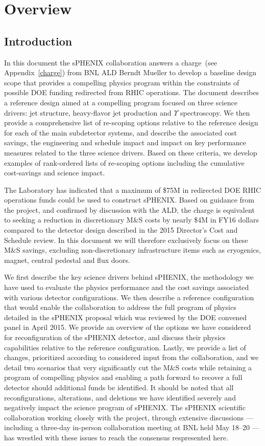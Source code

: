 \chapter{Overview}
\label{configurations}
\setcounter{page}{1}

\section{Introduction}
In this document the sPHENIX collaboration answers a charge~(see
Appendix~\ref{charge}) from BNL ALD Berndt Mueller to develop a
baseline design scope that provides a compelling physics program
within the constraints of possible DOE funding redirected from RHIC
operations. The document describes a reference design aimed at a
compelling program focused on three science drivers: jet structure,
heavy-flavor jet production and $\Upsilon$ spectroscopy. We then
provide a comprehensive list of re-scoping options relative to the
reference design for each of the main subdetector systems, and
describe the associated cost savings, the engineering and schedule
impact and impact on key performance measures related to the three
science drivers. Based on these criteria, we develop examples of
rank-ordered lists of re-scoping options including the cumulative
cost-savings and science impact.

The Laboratory has indicated that a maximum of \$75M in redirected DOE
RHIC operations funds could be used to construct sPHENIX.  Based on
guidance from the project, and confirmed by discussion with the ALD,
the charge is equivalent to seeking a reduction in discretionary M\&S
costs by nearly \$4M in FY16 dollars compared to the detector design
described in the 2015 Director's Cost and Schedule review.  In this
document we will therefore exclusively focus on these M\&S savings,
excluding non-discretionary infrastructure items such as cryogenics,
magnet, central pedestal and flux doors.

We first describe the key science drivers behind sPHENIX, the
methodology we have used to evaluate the physics performance and the
cost savings associated with various detector configurations.  We then
describe a reference configuration that would enable the collaboration
to address the full program of physics detailed in the sPHENIX
proposal which was reviewed by the DOE convened panel in April 2015.
We provide an overview of the options we have considered for
reconfiguration of the sPHENIX detector, and discuss their physics
capabilities relative to the reference configuration.  Lastly, we
provide a list of changes, prioritized according to considered input
from the collaboration, and we detail two scenarios that very
significantly cut the M\&S costs while retaining a program of
compelling physics and enabling a path forward to recover a full
detector should additional funds be identified.  It should be noted
that all reconfigurations, alterations, and deletions we have
identified severely and negatively impact the science program of
sPHENIX.  The sPHENIX scientific collaboration working closely with
the project, through extensive discussions --- including a three-day
in-person collaboration meeting at BNL held May 18--20 --- has
wrestled with these issues to reach the consensus respresented here.
